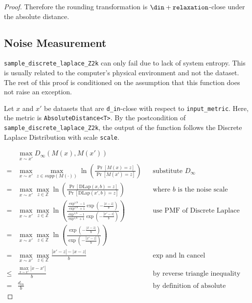 \documentclass{article}
\begin{document}
\begin{proof}
Therefore the rounding transformation is $\din + \texttt{relaxation}$-close under the absolute distance.

\subsection{Noise Measurement}
\texttt{sample\_discrete\_laplace\_Z2k} can only fail due to lack of system entropy. 
This is usually related to the computer's physical environment and not the dataset. 
The rest of this proof is conditioned on the assumption that this function does not raise an exception. 

Let $x$ and $x'$ be datasets that are \texttt{d\_in}-close with respect to \texttt{input\_metric}.
Here, the metric is \texttt{AbsoluteDistance<T>}.
By the postcondition of \texttt{sample\_discrete\_laplace\_Z2k},
the output of the function follows the Discrete Laplace Distribution with scale \texttt{scale}.

\begin{align*}
    & \max_{x \sim x'} D_{\infty}(M(x), M(x'))  \\
    =& \max_{x \sim x'} \max_{z \in supp(M(\cdot))} \ln\left(\frac{\Pr\left[M(x) = z\right]}{\Pr\left[M(x') = z \right]}\right)
        &&\text{substitute } D_{\infty}\\
    =& \max_{x \sim x'} \max_{z \in \mathbb{Z}} \ln\left(\frac{\Pr\left[\mathrm{DLap}(x, b) = z \right]}{\Pr\left[\mathrm{DLap}(x', b) = z\right]}\right)
        &&\text{where } b \text{ is the noise scale} \\
    =& \max_{x \sim x'} \max_{z \in \mathbb{Z}} \ln\left(\frac{
    \frac{\exp^{1/b} - 1}{\exp^{1/b} + 1} \exp \left( -\frac{|x - z|}{b} \right)
    }{
        \frac{\exp^{1/b} - 1}{\exp^{1/b} + 1} \exp \left( -\frac{|x' - z|}{b} \right)
    }\right) 
        &&\text{use PMF of Discrete Laplace} \\
    =& \max_{x \sim x'} \max_{z \in \mathbb{Z}} \ln\left(\frac{
    \exp \left( -\frac{|x - z|}{b} \right)
    }{
        \exp \left( -\frac{|x' - z|}{b} \right)
    }\right) \\
    =& \max_{x \sim x'} \max_{z \in \mathbb{Z}}\frac{|x' - z| - |x - z|}{b}&& \text{exp and ln cancel} \\
    \leq& \frac{\max_{x \sim x'} |x - x'|}{b} &&\text{by reverse triangle inequality} \\
    =& \frac{d_{in}}{b}  &&\text{by definition of absolute distance}
\end{align*}


\end{proof}
\end{document}
